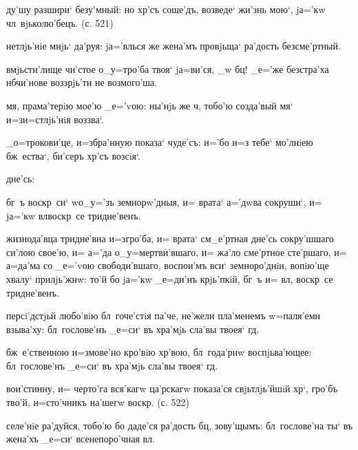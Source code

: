 
ду'шу разшири` безу'мный: но хр'съ соше'дъ, возведе` 
жи'знь мою`, jа='кw чл~вjьколю'бецъ. (с. 521)

нетлjь'нiе мнjь` да'руя: jа='влься же жена'мъ провjьща` 
ра'дость безсме'ртный.

вмjьсти'лище чи'стое о_у=тро'ба твоя` jа=ви'ся, _w бц! 
_е='же без\ъ стра'ха нб чи'нове воззрjь'ти не 
возмого'ша.


мя, прама'терiю мое'ю _е='vою: ны'нjь же ч, тобо'ю 
созда'вый мя` и=з\ъ и=стлjь'нiя воззва`.

_о=трокови'це, и=збра'нную показа` чуде'съ: и='бо и=з\ъ 
тебе` мо'лнiею бж~ества`, би'серъ хр'съ возсiя`.

дне'сь:

бг~ъ воскр~си` w\т о_у='зъ земнорw'дныя, и= врата` 
а='дwва сокруши`, и= jа='кw вл воскр~се тридне'венъ.

жизнода'вца тридне'вна и=з\ъ гро'ба, и= врата` см_е'ртная 
дне'сь сокру'шшаго си'лою свое'ю, и= а='да 
о_у=мертви'вшаго, и= жа'ло сме'ртное сте'ршаго, и= 
а=да'ма со _е='vою свободи'вшаго, воспои'мъ вси` 
земноро'днiи, вопiю'ще хвалу` прилjь'жнw: то'й бо jа='кw 
_е=ди'нъ крjь'пкiй, бг~ъ и= вл, воскр~се тридне'венъ.


персi'дстjьй любо'вiю бл~гоче'стiя па'че, не'жели 
пла'менемъ w=паля'еми взыва'ху: бл~гослове'нъ _е=си` въ 
хра'мjь сла'вы твоея` гд.

бж~е'ственною и=змове'но кро'вiю хр'вою, бл~года'рнw 
воспjьва'ющее: бл~гослове'нъ _е=си` въ хра'мjь сла'вы 
твоея` гд.

вои'стинну, и= черто'га вся'кагw ца'рскагw показа'ся 
свjьтлjь'йшiй хр`, гро'бъ тво'й, и=сто'чникъ на'шегw 
воскр. (с. 522)

селе'нiе ра'дуйся, тобо'ю бо даде'ся ра'дость бц, 
зову'щымъ: бл~гослове'на ты` въ жена'хъ _е=си` 
всенепоро'чная вл.

